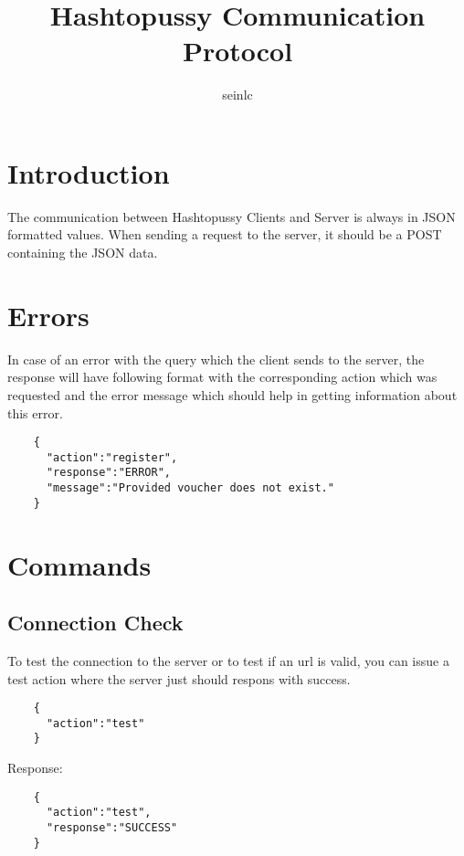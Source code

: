 \documentclass{article}
\author{seinlc}
\begin{document}
	\title{Hashtopussy Communication Protocol}
	\maketitle
	\section*{Introduction}
	The communication between Hashtopussy Clients and Server is always in JSON formatted values. When sending a request to the server, it should be a POST containing the JSON data.

	\section*{Errors}
	In case of an error with the query which the client sends to the server, the response will have following format with the corresponding action which was requested and the error message which should help in getting information about this error.
	\begin{verbatim}
	{
	  "action":"register",
	  "response":"ERROR",
	  "message":"Provided voucher does not exist."
	}
	\end{verbatim}
	\pagebreak
	\section*{Commands}
	
	\subsection*{Connection Check}
	To test the connection to the server or to test if an url is valid, you can issue a test action where the server just should respons with success.
	\begin{verbatim}
	{
	  "action":"test"
	}
	\end{verbatim}
	Response:
	\begin{verbatim}
	{
	  "action":"test",
	  "response":"SUCCESS"
	} 
	\end{verbatim}
\end{document}
